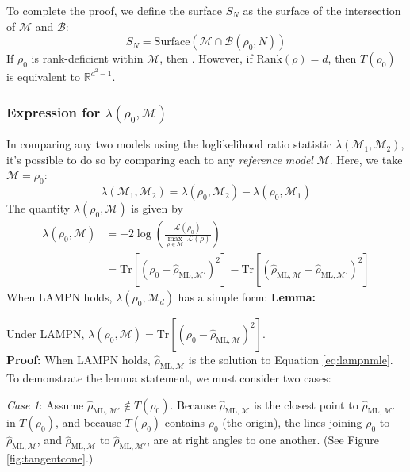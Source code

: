 \documentclass[aps,pra, twocolumn]{revtex4-1}
\newcommand{\M}{\mathcal{M}}
\newcommand{\cL}{\mathcal{L}}
\newcommand{\rhohat}{\hat{\rho}}
\newcommand{\rhoML}[1]{\rhohat_{\scriptscriptstyle{\mathrm{ML},#1}}}
\begin{document}
To complete the proof, we define the surface $S_{N}$ as the surface of the intersection of $\M$ and $\mathcal{B}$:
\[S_{N} = \text{Surface}(\M \cap \mathcal{B}(\rho_{0}, N))\]
If $\rho_{0}$ is rank-deficient within $\M$, then . However, if $\mathrm{Rank}(\rho)  = d$, then $T(\rho_{0})$ is equivalent to $\mathbb{R}^{d^{2}-1}$.

\subsubsection{Expression for $\lambda(\rho_{0}, \M)$}

In comparing any two models using the loglikelihood ratio statistic $\lambda(\M_{1}, \M_{2})$, it's possible to do so by comparing each to any \emph{reference model} $\M$. Here, we take $\M = \rho_{0}$:
\[\lambda(\M_{1}, \M_{2}) = \lambda(\rho_{0},\M_{2}) - \lambda(\rho_{0},\M_{1})\]
The quantity $\lambda(\rho_{0}, \M)$ is given by
\begin{align}
\nonumber \lambda(\rho_{0}, \M) &= -2 \log \left(\frac{\cL(\rho_{0})}{\underset{\rho \in \M}{\max}~\cL(\rho)}\right)\\
\label{eq:lambdalan}
&= \mathrm{Tr}[(\rho_{0} - \rhoML{\M'})^{2}] - \mathrm{Tr}[(\rhoML{\M} - \rhoML{\M'})^{2}]
\end{align}
When LAMPN holds, $\lambda(\rho_{0}, \M_{d})$ has a simple form:
\textbf{Lemma:}

Under LAMPN, $\lambda(\rho_{0}, \M) = \mathrm{Tr}[(\rho_{0} - \rhoML{\M})^{2}]$.
~\\
\textbf{Proof:}
When LAMPN holds, $\rhoML{\M}$ is the solution to Equation \eqref{eq:lampnmle}. To demonstrate the lemma statement, we must consider two cases:

\emph{Case 1}: Assume $\rhoML{\M'} \not \in T(\rho_{0})$. Because $\rhoML{\M}$ is the closest point to $\rhoML{\M'}$ in $T(\rho_{0})$, and because $T(\rho_{0})$ contains $\rho_{0}$ (the origin), the lines joining $\rho_{0}$ to $\rhoML{\M}$, and $\rhoML{\M}$ to $\rhoML{\M'}$, are at right angles to one another. (See Figure \ref{fig:tangentcone}.) 
\end{document}
